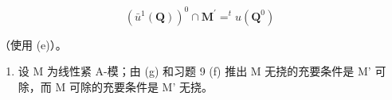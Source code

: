 \[
(\bar {u} ^ {1} (\mathbf {Q})) ^ {0} \cap \mathbf {M} ^ {\prime} = ^ {t} u (\mathbf {Q} ^ {0})
\]

（使用 (e)）。

\begin{enumerate}
\def\labelenumi{(\alph{enumi})}
\setcounter{enumi}{7}
\tightlist
\item
  设 M 为线性紧 A-模；由 (g) 和习题 9 (f) 推出 M 无挠的充要条件是 M' 可除，而 M 可除的充要条件是 M' 无挠。
\end{enumerate}

